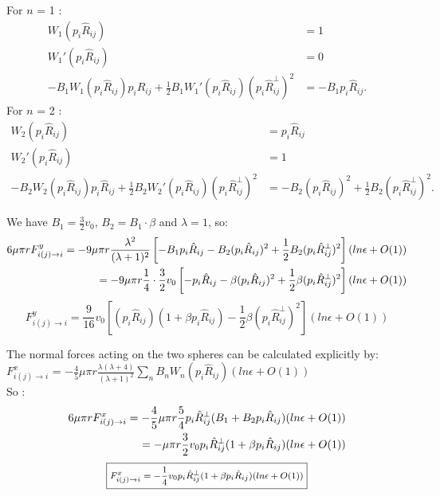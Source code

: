 \documentclass{article}
\begin{document}
For $n$ = 1 : \begin{align*}
    W_1(p_i\hat{R}_{ij}) &= 1 \\
    W_1'(p_i\hat{R}_{ij}) &= 0 \\
    -B_1 W_1(p_i\hat{R}_{ij})p_i\hat{R}_{ij} + \frac{1}{2} B_1  W_1'(p_i\hat{R}_{ij}) (p_i\hat{R}^{\perp}_{ij})^2  &= -B_1 p_i\hat{R}_{ij}.
\end{align*} 
For $n$ = 2 : \begin{align*}
    W_2(p_i\hat{R}_{ij}) &= p_i\hat{R}_{ij} \\
    W_2'(p_i\hat{R}_{ij}) &= 1\\
    -B_2 W_2(p_i\hat{R}_{ij})p_i\hat{R}_{ij}+ \frac{1}{2} B_2  W_2'(p_i\hat{R}_{ij}) (p_i\hat{R}^{\perp}_{ij})^2  &= -B_2 (p_i\hat{R}_{ij})^2 + \frac{1}{2} B_2(p_i\hat{R}^{\perp}_{ij})^2.
\end{align*}  

We have $B_1 = \frac{3}{2}v_0$, $B_2 = B_1\cdot\beta$ and $\lambda=1$, so:
\begin{align*}
\footnotesize
6\mu\pi rF_{i(j)\rightarrow i}^{y} = -9 \mu \pi r \frac{\lambda ^2}{(\lambda +1)^2} \left[ -B_1 p_i\hat{R}_{ij} -B_2 (p_i\hat{R}_{ij})^2 + \frac{1}{2} B_2(p_i\hat{R}^{\perp}_{ij})^2\right](ln \epsilon + O(1))\\
= -9 \mu \pi r \frac{1}{4}\cdot\frac{3}{2}v_0\left[ -p_i\hat{R}_{ij} -\beta (p_i\hat{R}_{ij})^2 + \frac{1}{2} \beta(p_i\hat{R}^{\perp}_{ij})^2\right](ln \epsilon + O(1))
\end{align*}
\begin{equation*}
\boxed{
    F_{i(j)\rightarrow i}^{y} = \frac{9}{16}v_0
\left[(p_i\hat{R}_{ij})(1 + \beta p_i\hat{R}_{ij}) - \frac{1}{2}\beta(p_i\hat{R}^{\perp}_{ij})^2\right](ln \epsilon + O(1))
}
\end{equation*}
\normalsize
\vspace{0.5cm}

The normal forces acting on the two spheres can be calculated explicitly by: \\
 $F_{i(j)\rightarrow i}^{x}$ = $-\frac{4}{5} \mu \pi r \frac{\lambda(\lambda +4)}{(\lambda +1)^2} \sum_{n} B_n W_n(p_i\hat{R}_{ij}) (ln \epsilon + O(1))$ \cite{Brumley}
\\ So :
\begin{align*}
    \footnotesize
    6\mu\pi rF_{i(j)\rightarrow i}^{x} = -\frac{4}{5}\mu\pi r\frac{5}{4}p_i\hat{R}^{\perp}_{ij}(B_1 + B_2 p_i\hat{R}_{ij})(ln \epsilon + O(1))\\
    = -\mu\pi r\frac{3}{2}v_0p_i\hat{R}^{\perp}_{ij}(1 + \beta p_i\hat{R}_{ij})(ln \epsilon + O(1))
\end{align*}
\begin{equation*}
    \footnotesize
    \boxed{F_{i(j)\rightarrow i}^{x} = -\frac{1}{4}v_0p_i\hat{R}^{\perp}_{ij}(1 + \beta p_i\hat{R}_{ij})(ln \epsilon + O(1))}
\end{equation*}
\end{document}
